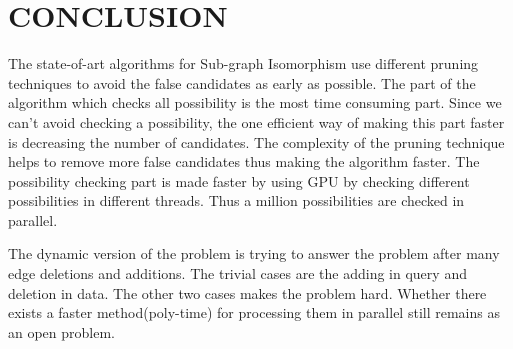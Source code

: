 \chapter{CONCLUSION}
\label{chap:concl}



\hspace{10mm} The state-of-art algorithms for Sub-graph Isomorphism use different pruning techniques to avoid the false candidates as early as possible.  The part of the algorithm which checks all possibility is the most time consuming part. Since we can't avoid checking a possibility, the one efficient way of making this part faster is decreasing the number of candidates. The complexity of the pruning technique helps to remove more false candidates thus  making the algorithm faster. The possibility checking part is made faster by using GPU by checking different possibilities in different threads. Thus a million possibilities are checked in parallel.

\hspace{10mm}The dynamic version of the problem is trying to answer the problem after many edge deletions and additions. The trivial cases are the adding in query and deletion in data. The other two cases makes the problem hard. Whether there exists a faster method(poly-time) for processing them in parallel still remains as an open problem. 


